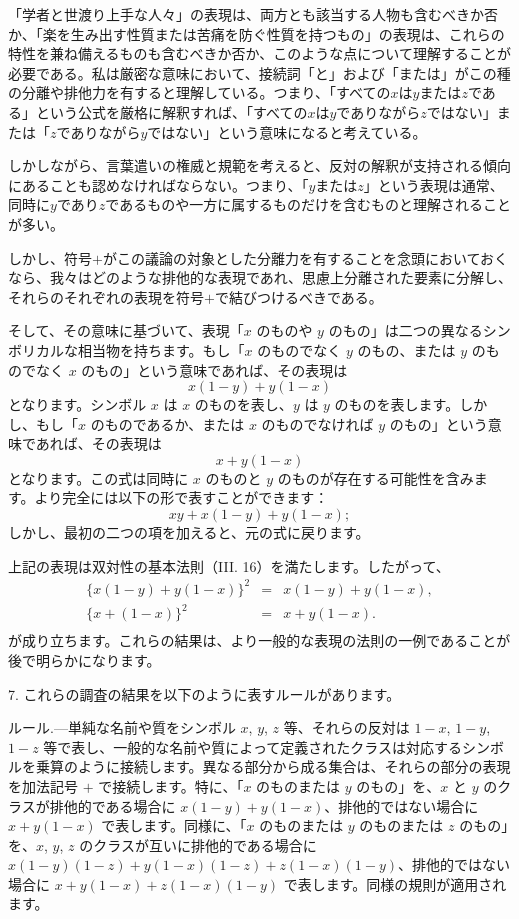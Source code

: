 \documentclass[a4paper,11pt,openany]{ltjsbook}
\begin{document}
「学者と世渡り上手な人々」の表現は、両方とも該当する人物も含むべきか否か、「楽を生み出す性質または苦痛を防ぐ性質を持つもの」の表現は、これらの特性を兼ね備えるものも含むべきか否か、このような点について理解することが必要である。私は厳密な意味において、接続詞「と」および「または」がこの種の分離や排他力を有すると理解している。つまり、「すべての$x$は$y$または$z$である」という公式を厳格に解釈すれば、「すべての$x$は$y$でありながら$z$ではない」または「$z$でありながら$y$ではない」という意味になると考えている。

しかしながら、言葉遣いの権威と規範を考えると、反対の解釈が支持される傾向にあることも認めなければならない。つまり、「$y$または$z$」という表現は通常、同時に$y$であり$z$であるものや一方に属するものだけを含むものと理解されることが多い。

しかし、符号$+$がこの議論の対象とした分離力を有することを念頭においておくなら、我々はどのような排他的な表現であれ、思慮上分離された要素に分解し、それらのそれぞれの表現を符号$+$で結びつけるべきである。

そして、その意味に基づいて、表現「$x$ のものや $y$ のもの」は二つの異なるシンボリカルな相当物を持ちます。もし「$x$ のものでなく $y$ のもの、または $y$ のものでなく $x$ のもの」という意味であれば、その表現は
\[ x (1 - y) + y ( 1 - x) \]
となります。シンボル $x$ は $x$ のものを表し、$y$ は $y$ のものを表します。しかし、もし「$x$ のものであるか、または $x$ のものでなければ $y$ のもの」という意味であれば、その表現は
\[ x + y (1 - x) \]
となります。この式は同時に $x$ のものと $y$ のものが存在する可能性を含みます。より完全には以下の形で表すことができます：
\[ xy + x (1 - y) + y ( 1 - x); \]
しかし、最初の二つの項を加えると、元の式に戻ります。

上記の表現は双対性の基本法則（III. 16）を満たします。したがって、
\begin{eqnarray*}
\{x (1 - y) + y (1 - x)\}^2 &=& x (1 -y) + y (1 - x),\\
\{x + (1-x)\}^2 &=& x+y(1-x).\\
\end{eqnarray*}
が成り立ちます。これらの結果は、より一般的な表現の法則の一例であることが後で明らかになります。

7. これらの調査の結果を以下のように表すルールがあります。

\textsc{ルール}.---単純な名前や質をシンボル $x$, $y$, $z$ 等、それらの反対は $1 - x$, $1 - y$, $1 - z$ 等で表し、一般的な名前や質によって定義されたクラスは対応するシンボルを乗算のように接続します。異なる部分から成る集合は、それらの部分の表現を加法記号 $+$ で接続します。特に、「$x$ のものまたは $y$ のもの」を、$x$ と $y$ のクラスが排他的である場合に $x (1 - y) + y (1 - x)$、排他的ではない場合に $x + y (1 - x)$ で表します。同様に、「$x$ のものまたは $y$ のものまたは $z$ のもの」を、$x$, $y$, $z$ のクラスが互いに排他的である場合に $x(1-y)(1-z) + y(1-x)(1-z) + z(1-x)(1-y)$、排他的ではない場合に $x + y (1 - x) + z (1 - x) (1-y)$ で表します。同様の規則が適用されます。
\end{document}
